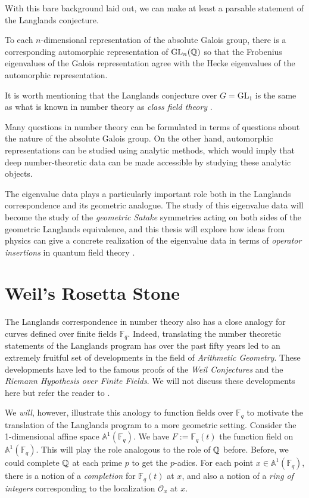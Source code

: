 With this bare background laid out, we can make at least a parsable statement of the Langlands conjecture.

\begin{conj}[Langlands]
	To each $n$-dimensional representation of the absolute Galois group, there is a corresponding automorphic representation of $\mathrm{GL}_n(\mathbb{Q})$ so that the Frobenius eigenvalues of the Galois representation agree with the Hecke eigenvalues of the automorphic representation.
\end{conj}

It is worth mentioning that the Langlands conjecture over $G = \mathrm{GL}_1$ is the same as what is known in number theory as \emph{class field theory} \cite{66515}. 


Many questions in number theory can be formulated in terms of questions about the nature of the absolute Galois group. On the other hand, automorphic representations can be studied using analytic methods, which would imply that deep number-theoretic data can be made accessible by studying these analytic objects.

The eigenvalue data plays a particularly important role both in the Langlands correspondence and its geometric analogue. The study of this eigenvalue data will become the study of the \emph{geometric Satake} symmetries acting on both sides of the geometric Langlands equivalence, and this thesis will explore how ideas from physics can give a concrete realization of the eigenvalue data in terms of \emph{operator insertions} in quantum field theory \cite{kapustin2006}. 


\section{Weil's Rosetta Stone} %
\label{sec:weil_s_rosetta_stone}

The Langlands correspondence in number theory also has a close analogy for curves defined over finite fields $\mathbb F_q$. Indeed, translating the number theoretic statements of the Langlands program has over the past fifty years led to an extremely fruitful set of developments in the field of \emph{Arithmetic Geometry}. These developments have led to the famous proofs of the \emph{Weil Conjectures} and the \emph{Riemann Hypothesis over Finite Fields}. We will not discuss these developments here but refer the reader to \cite{osserman2008}. 

We \emph{will}, however, illustrate this anology to function fields over $\mathbb F_q$ to motivate the translation of the Langlands program to a more geometric setting. Consider the 1-dimensional affine space $\mathbb A^1 (\mathbb F_q)$. We have $F := \mathbb F_q(t)$ the function field on $\mathbb A^1 (\mathbb F_q)$. This will play the role analogous to the role of $\mathbb{Q}$ before. Before, we could complete $\mathbb{Q}$ at each prime $p$ to get the $p$-adics. For each point $x \in \mathbb A^1 (\mathbb F_q)$, there is a notion of a \emph{completion} for $\mathbb F_q(t)$ at $x$, and also a notion of a \emph{ring of integers} corresponding to the localization $\mathcal O_x$ at $x$.

